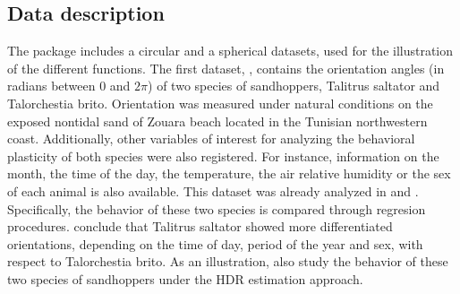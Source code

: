 \subsection{Data description}

The package  includes a circular and a spherical datasets, used for the illustration of the different functions. The first dataset, ,  contains the orientation angles (in radians between $0$ and $2\pi$) of two species of sandhoppers, Talitrus saltator and Talorchestia brito. Orientation was measured under natural conditions on the exposed nontidal sand of Zouara beach located in the Tunisian northwestern coast. Additionally, other variables of interest for analyzing the behavioral plasticity of both species were also registered. For instance, information on the month, the time of the day, the temperature, the air relative humidity or the sex of each animal is also available. This dataset was already analyzed in \cite{scapini2002multiple} and \cite{marchetti2003use}. Specifically, the behavior of these two species is compared through regresion procedures. \cite{scapini2002multiple} conclude that Talitrus saltator showed more differentiated orientations, depending on the time of day, period of the year and sex, with respect to Talorchestia brito. As an illustration, \cite{saavedra2020nonparametric} also study the behavior of these two species of sandhoppers under the HDR estimation approach.

